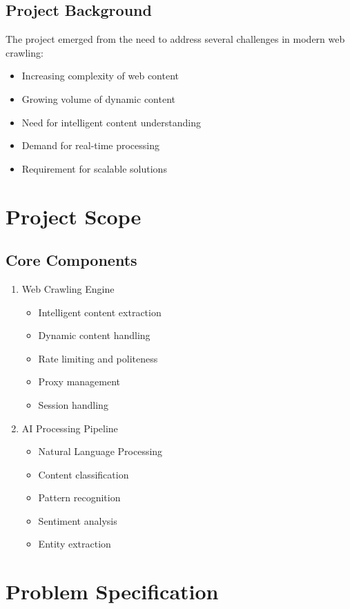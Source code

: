 \documentclass[12pt,a4paper]{report}
\begin{document}
\subsection{Project Background}
The project emerged from the need to address several challenges in modern web crawling:
\begin{itemize}
    \item Increasing complexity of web content
    \item Growing volume of dynamic content
    \item Need for intelligent content understanding
    \item Demand for real-time processing
    \item Requirement for scalable solutions
\end{itemize}

\section{Project Scope}
\subsection{Core Components}
\begin{enumerate}
    \item Web Crawling Engine
    \begin{itemize}
        \item Intelligent content extraction
        \item Dynamic content handling
        \item Rate limiting and politeness
        \item Proxy management
        \item Session handling
    \end{itemize}
    
    \item AI Processing Pipeline
    \begin{itemize}
        \item Natural Language Processing
        \item Content classification
        \item Pattern recognition
        \item Sentiment analysis
        \item Entity extraction
    \end{itemize}
\end{enumerate}

\section{Problem Specification}
\end{document}

